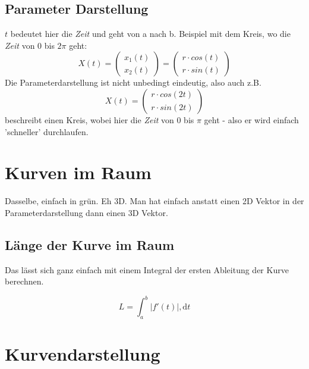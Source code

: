 \subsection{Parameter Darstellung}
\(t\) bedeutet hier die \textit{Zeit} und geht von a nach b. Beispiel mit dem Kreis, wo die \textit{Zeit} von \(0\) bis \(2\pi\) geht:
\begin{displaymath}
X(t) = 
\begin{pmatrix}
x_1(t) \\
x_2(t)
\end{pmatrix} = 
\begin{pmatrix}
r\cdot cos(t)\\
r\cdot sin(t)
\end{pmatrix}
\end{displaymath}
Die Parameterdarstellung ist nicht unbedingt eindeutig, also auch z.B. 
\begin{displaymath}
X(t) = 
\begin{pmatrix}
r\cdot cos(2t)\\
r\cdot sin(2t)
\end{pmatrix}
\end{displaymath}
beschreibt einen Kreis, wobei hier die \textit{Zeit} von 0 bis \(\pi\) geht - also er wird einfach 'schneller' durchlaufen.


\section{Kurven im Raum}
Dasselbe, einfach in grün. Eh 3D. Man hat einfach anstatt einen 2D Vektor in der Parameterdarstellung dann einen 3D Vektor.

\subsection{Länge der Kurve im Raum}
Das lässt sich ganz einfach mit einem Integral der ersten Ableitung der Kurve berechnen.

\begin{displaymath}
L = \int_a^b |f'(t)|,\mathrm{d}t
\end{displaymath}

\section{Kurvendarstellung}
